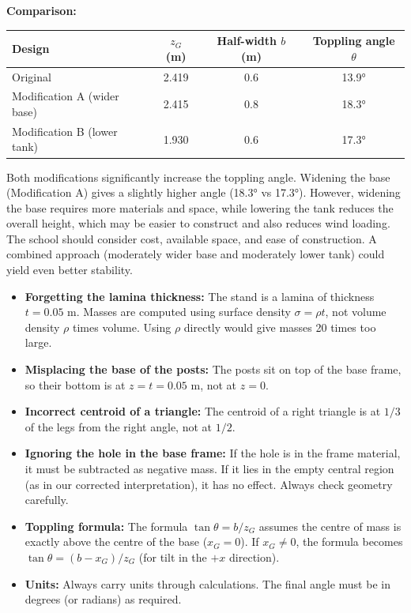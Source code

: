 \documentclass[11pt]{article}
\newcounter{popsec}
\newcounter{popsub}
\newcommand{\courssub}[1]{%
  \stepcounter{popsub}%
  \par\vspace{9pt}\noindent{\popxbold\fontsize{11.5}{13}\selectfont\color{popink}{\color{poporange}\thepopsec.\thepopsub}\hspace{6pt}#1}\par\nopagebreak\vspace{4pt}
}
\begin{document}
\begin{exoresolu}
\textbf{Comparison:}
\begin{center}
\begin{tabular}{|l|c|c|c|}
\hline
\textbf{Design} & \textbf{$z_G$ (m)} & \textbf{Half-width $b$ (m)} & \textbf{Toppling angle $\theta$} \\
\hline
Original & 2.419 & 0.6 & 13.9° \\
Modification A (wider base) & 2.415 & 0.8 & 18.3° \\
Modification B (lower tank) & 1.930 & 0.6 & 17.3° \\
\hline
\end{tabular}
\end{center}
Both modifications significantly increase the toppling angle. Widening the base (Modification A) gives a slightly higher angle (18.3° vs 17.3°). However, widening the base requires more materials and space, while lowering the tank reduces the overall height, which may be easier to construct and also reduces wind loading. The school should consider cost, available space, and ease of construction. A combined approach (moderately wider base and moderately lower tank) could yield even better stability.
\end{exoresolu}

\courssub{Common Mistakes}
\begin{attention}
\begin{itemize}
    \item \textbf{Forgetting the lamina thickness:} The stand is a lamina of thickness $t=0.05$ m. Masses are computed using surface density $\sigma = \rho t$, not volume density $\rho$ times volume. Using $\rho$ directly would give masses 20 times too large.
    \item \textbf{Misplacing the base of the posts:} The posts sit on top of the base frame, so their bottom is at $z = t = 0.05$ m, not at $z=0$.
    \item \textbf{Incorrect centroid of a triangle:} The centroid of a right triangle is at $1/3$ of the legs from the right angle, not at $1/2$.
    \item \textbf{Ignoring the hole in the base frame:} If the hole is in the frame material, it must be subtracted as negative mass. If it lies in the empty central region (as in our corrected interpretation), it has no effect. Always check geometry carefully.
    \item \textbf{Toppling formula:} The formula $\tan\theta = b/z_G$ assumes the centre of mass is exactly above the centre of the base ($x_G=0$). If $x_G \neq 0$, the formula becomes $\tan\theta = (b - x_G)/z_G$ (for tilt in the $+x$ direction).
    \item \textbf{Units:} Always carry units through calculations. The final angle must be in degrees (or radians) as required.
\end{itemize}
\end{attention}
\end{document}
